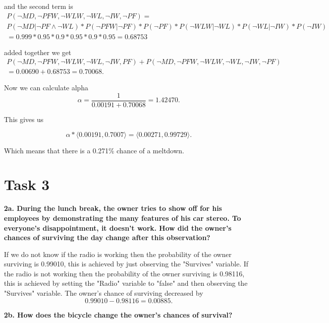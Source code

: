 \documentclass[a4paper,10pt]{article}
\begin{document}
and the second term is
\begin{multline}
	P(\neg MD, \neg PFW, \neg WLW, \neg WL, \neg IW, \neg PF) = \\
	P(\neg MD | \neg PF \wedge \neg WL) * P(\neg PFW | \neg PF) * P(\neg PF) * P(\neg WLW | \neg WL) * P(\neg WL | \neg IW) * P(\neg IW) \\
	= 0.999 * 0.95 * 0.9 * 0.95 * 0.9 * 0.95 = 0.68753
\end{multline}

added together we get
\begin{multline}
	P(\neg MD, \neg PFW, \neg WLW, \neg WL, \neg IW, PF) + P(\neg MD, \neg PFW, \neg WLW, \neg WL, \neg IW, \neg PF) \\ 
	= 0.00690 + 0.68753 = 0.70068.
\end{multline}

Now we can calculate alpha
\begin{equation*}
	\alpha = \frac{1}{0.00191 + 0.70068} = 1.42470.
\end{equation*}

This gives us

\begin{equation}
	\alpha * \langle 0.00191, 0.7007\rangle = \langle 0.00271, 0.99729\rangle.
\end{equation}

Which means that there is a 0.271\% chance of a meltdown.

\section*{Task 3}

\textbf{2a. During the lunch break, the owner tries to show off for his employees by demonstrating the many features of his car stereo.
 To everyone's disappointment, it doesn't work. 
 How did the owner's chances of surviving the day change after this observation?}

 If we do not know if the radio is working then the probability of the owner surviving is 0.99010, this is achieved by just observing the "Survives" variable.
 If the radio is not working then the probability of the owner surviving is 0.98116, this is achieved by setting the "Radio" variable to "false" and
 then observing the "Survives" variable.
 The owner's chance of surviving decreased by 
 \begin{equation*}
	0.99010 - 0.98116 = 0.00885.
 \end{equation*} 

 \textbf{2b. How does the bicycle change the owner's chances of survival?}
\end{document}
